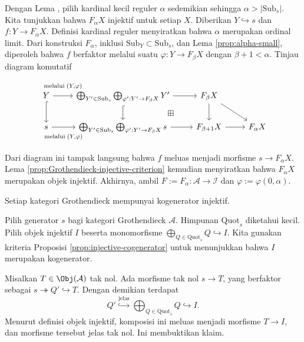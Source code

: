 \begin{bukti}
	Dengan Lema , pilih kardinal kecil reguler
	$\alpha$ sedemikian sehingga $\alpha>|\mathrm{Sub}_s|$. Kita tunjukkan
	bahwa $F_\alpha X$ injektif untuk setiap $X$. Diberikan
	$Y\hookrightarrow s$ dan $f:Y\to F_\alpha X$. Definisi kardinal reguler
	 menyiratkan bahwa $\alpha$ merupakan ordinal
	limit. Dari konstruksi $F_\alpha$, inklusi
	$\mathrm{Sub}_Y\subset\mathrm{Sub}_s$, dan Lema
	\ref{prop:alpha-small}, diperoleh bahwa $f$ berfaktor melalui suatu
	$\varphi:Y\to F_\beta X$ dengan $\beta+1<\alpha$. Tinjau diagram
	komutatif
	\[\begin{tikzcd}
		Y \arrow[r, "{\text{melalui}\; (Y, \varphi)}" inner sep=0.8em] \arrow[hookrightarrow, d] & \bigoplus_{Y' \in \mathrm{Sub}_s} \bigoplus_{\varphi': Y' \to F_\beta X} Y' \arrow[r] \arrow[hookrightarrow, d] & F_\beta X \arrow[d] \arrow[rd] & \\
		s \arrow[r, "{\text{melalui}\; (Y, \varphi)}"' inner sep=0.8em] & \bigoplus_{Y' \in \mathrm{Sub}_s} \bigoplus_{\varphi': Y' \to F_\beta X} s \arrow[r] & F_{\beta + 1} X \arrow[phantom, lu, "\boxplus" description] \arrow[r] & F_\alpha X
	\end{tikzcd}\]
	Dari diagram ini tampak langsung bahwa $f$ meluas menjadi morfisme
	$s\to F_\alpha X$. Lema
	\ref{prop:Grothendieck-injective-criterion} kemudian menyiratkan bahwa
	$F_\alpha X$ merupakan objek injektif. Akhirnya, ambil
	$F:=F_\alpha:\mathcal{A}\to\mathcal{I}$ dan
	$\varphi:=\varphi(0,\alpha)$.
\end{bukti}

\begin{korolari}\label{prop:Grothendieck-cat-cogenerator}
	Setiap kategori Grothendieck mempunyai kogenerator injektif.
\end{korolari}
\begin{bukti}
	Pilih generator $s$ bagi kategori Grothendieck $\mathcal{A}$. Himpunan
	$\mathrm{Quot}_s$ diketahui kecil. Pilih objek injektif $I$ beserta
	monomorfisme
	$\bigoplus_{Q\in\mathrm{Quot}_s}Q\hookrightarrow I$. Kita gunakan
	kriteria Proposisi \ref{prop:injective-cogenerator} untuk menunjukkan bahwa
	$I$ merupakan kogenerator.

	Misalkan $T\in\Obj(\mathcal{A})$ tak nol. Ada morfisme tak nol
	$s\to T$, yang berfaktor sebagai $s\twoheadrightarrow Q'\hookrightarrow T$.
	Dengan demikian terdapat
	\[ Q' \stackrel{\text{jelas}}{\hookrightarrow}
	\bigoplus_{Q \in \mathrm{Quot}_s} Q \hookrightarrow I. \]
	Menurut definisi objek injektif, komposisi ini meluas menjadi morfisme
	$T\to I$, dan morfisme tersebut jelas tak nol. Ini membuktikan klaim.
\end{bukti}

